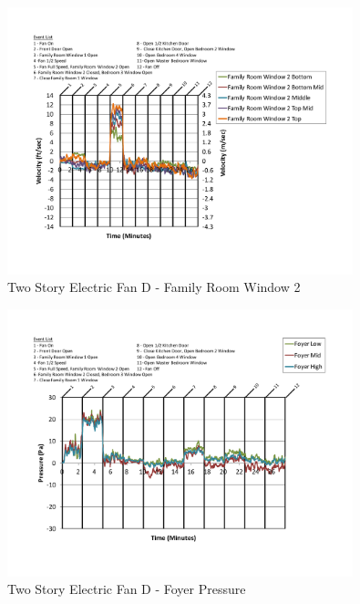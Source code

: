 \documentclass{article}
\begin{document}
\begin{appendices}
	\begin{figure}[H]
		\centering
		\includegraphics[height=3.05in,trim=0.67in 1.1in 0.67in 0.8in,clip=true]{0_Images/Results_Charts/ColdFlow/Two_Story/Electric/D/Family_Room_Window_2.pdf}
		\caption{Two Story Electric Fan D - Family Room Window 2}
	\end{figure}
 

	\begin{figure}[H]
		\centering
		\includegraphics[height=3.05in,trim=0.67in 1.1in 0.67in 0.8in,clip=true]{0_Images/Results_Charts/ColdFlow/Two_Story/Electric/D/Foyer_Pressure.pdf}
		\caption{Two Story Electric Fan D - Foyer Pressure}
	\end{figure}
 
	\clearpage


\end{appendices}
\end{document}
